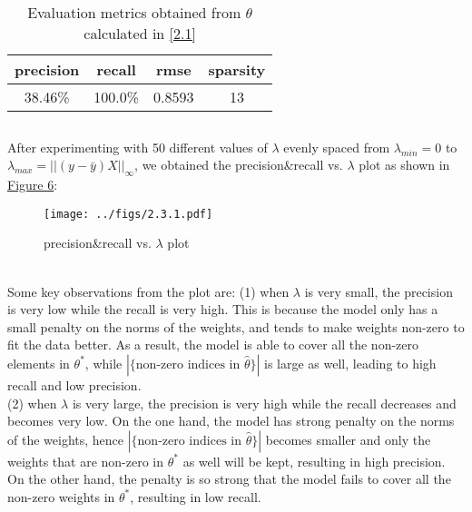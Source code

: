 \documentclass{article}
\begin{document}
        \subsection{}
        \begin{table}[hbt!]
            \centering
            \begin{tabular}{|c|c|c|c|}
                \hline
                precision&recall&rmse&sparsity\\
                \hline\hline
                38.46\%&100.0\%&0.8593&13\\
                \hline
            \end{tabular}
            \caption{Evaluation metrics obtained from $\theta$ calculated in \ref{2.1}}
        \end{table}

        \subsection{}
        After experimenting with 50 different values of $\lambda$ evenly spaced from $\lambda_{min}=0$ to $\lambda_{max}=||(y-\bar{y})X||_{\infty}$,
        we obtained the precision\&recall vs. $\lambda$ plot as shown in \hyperref[fig:2.3.1]{Figure 6}:
        \begin{figure}[hbt!]
            \centering
            \texttt{[image: ../figs/2.3.1.pdf]}
            \caption{precision\&recall vs. $\lambda$ plot}
            \label{fig:2.3.1}
        \end{figure}\\
        Some key observations from the plot are: (1) when $\lambda$ is very small, the precision is very low while the recall is very high. 
        This is because the model only has a small penalty on the norms of the weights,
        and tends to make weights non-zero to fit the data better. 
        As a result, the model is able to cover all the non-zero elements in $\theta^{*}$,
        while $|\{\text{non-zero indices in } \hat{\theta}\}|$ is large as well, leading to high recall and low precision.\\
        (2) when $\lambda$ is very large, the precision is very high while the recall decreases and becomes very low.
        On the one hand, the model has strong penalty on the norms of the weights, 
        hence $|\{\text{non-zero indices in } \hat{\theta}\}|$ becomes smaller and only the weights that are non-zero in $\theta^{*}$ as well will be kept, resulting in high precision.
        On the other hand, the penalty is so strong that the model fails to cover all the non-zero weights in $\theta^{*}$, resulting in low recall.\\
\end{document}
